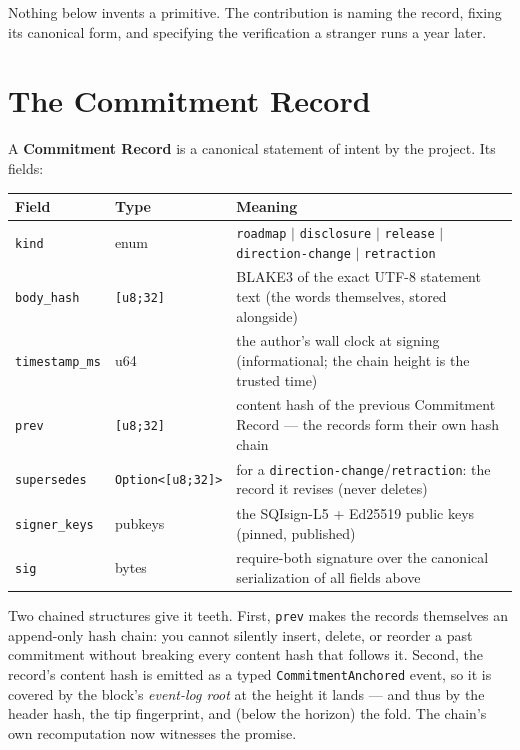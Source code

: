 \documentclass[10pt,a4paper]{article}
\begin{document}
Nothing below invents a primitive. The contribution is naming the record, fixing its
canonical form, and specifying the verification a stranger runs a year later.

\section{The Commitment Record}
A \textbf{Commitment Record} is a canonical statement of intent by the project. Its
fields:

\begin{center}\small
\renewcommand{\arraystretch}{1.25}
\begin{tabularx}{\textwidth}{@{}l l X@{}}
\toprule
\textbf{Field} & \textbf{Type} & \textbf{Meaning} \\
\midrule
\texttt{kind} & enum & \texttt{roadmap} $|$ \texttt{disclosure} $|$ \texttt{release} $|$ \texttt{direction-change} $|$ \texttt{retraction} \\
\texttt{body\_hash} & \texttt{[u8;32]} & BLAKE3 of the exact UTF-8 statement text (the words themselves, stored alongside) \\
\texttt{timestamp\_ms} & u64 & the author's wall clock at signing (informational; the chain height is the trusted time) \\
\texttt{prev} & \texttt{[u8;32]} & content hash of the previous Commitment Record --- the records form their own hash chain \\
\texttt{supersedes} & \texttt{Option<[u8;32]>} & for a \texttt{direction-change}/\texttt{retraction}: the record it revises (never deletes) \\
\texttt{signer\_keys} & pubkeys & the SQIsign-L5 + Ed25519 public keys (pinned, published) \\
\texttt{sig} & bytes & require-both signature over the canonical serialization of all fields above \\
\bottomrule
\end{tabularx}
\end{center}

Two chained structures give it teeth. First, \texttt{prev} makes the records
themselves an append-only hash chain: you cannot silently insert, delete, or reorder a
past commitment without breaking every content hash that follows it. Second, the
record's content hash is emitted as a typed \texttt{CommitmentAnchored} event, so it is
covered by the block's \emph{event-log root} at the height it lands --- and thus by the
header hash, the tip fingerprint, and (below the horizon) the fold. The chain's own
recomputation now witnesses the promise.
\end{document}
